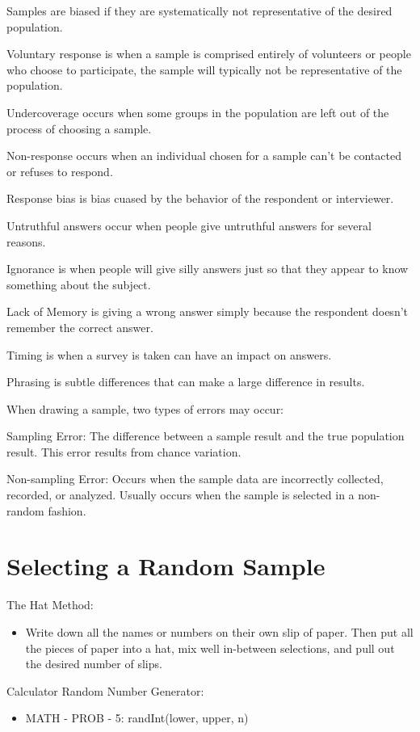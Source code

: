 \documentclass[../stats.tex]{subfiles}
\begin{document}
Samples are biased if they are systematically not representative of the desired population. 

Voluntary response is when a sample is comprised entirely of volunteers or people who choose to participate, the sample will typically not be representative of the population.

Undercoverage occurs when some groups in the population are left out of the process of choosing a sample.

Non-response occurs when an individual chosen for a sample can't be contacted or refuses to respond. 

Response bias is bias cuased by the behavior of the respondent or interviewer.

Untruthful answers occur when people give untruthful answers for several reasons.

Ignorance is when people will give silly answers just so that they appear to know something about the subject.

Lack of Memory is giving a wrong answer simply because the respondent doesn't remember the correct answer.

Timing is when a survey is taken can have an impact on answers.

Phrasing is subtle differences that can make a large difference in results. 

When drawing a sample, two types of errors may occur:

Sampling Error: The difference between a sample result and the true population result. This error results from chance variation.

Non-sampling Error: Occurs when the sample data are incorrectly collected, recorded, or analyzed. Usually occurs when the sample is selected in a non-random fashion.
\section{Selecting a Random Sample}
The Hat Method:
\begin{itemize}
    \item Write down all the names or numbers on their own slip of paper. Then put all the pieces of paper into a hat, mix well in-between selections, and pull out the desired number of slips.
\end{itemize}

Calculator Random Number Generator:
\begin{itemize}
    \item MATH - PROB - 5: randInt(lower, upper, n)
\end{itemize}
\end{document}
